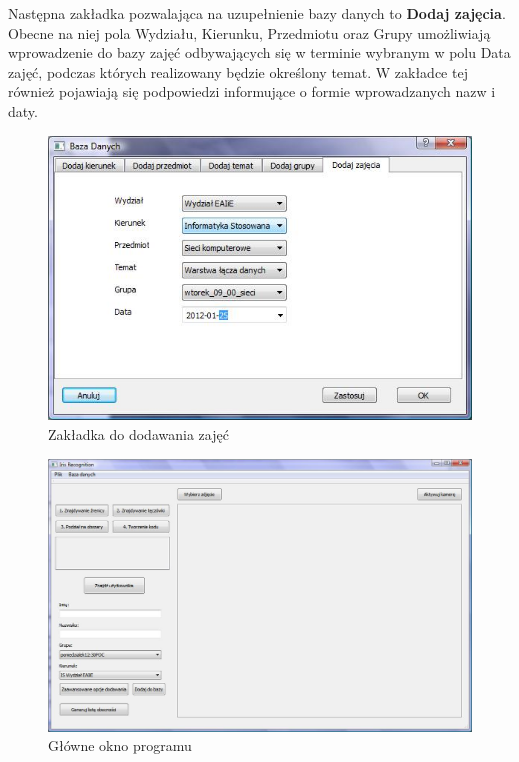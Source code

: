 Następna zakładka pozwalająca na uzupełnienie bazy danych to \textbf{Dodaj zajęcia}. Obecne na niej pola Wydziału, Kierunku, Przedmiotu oraz Grupy umożliwiają wprowadzenie do bazy zajęć odbywających się w terminie wybranym w polu Data zajęć, podczas których realizowany będzie określony temat. W zakładce tej również pojawiają się podpowiedzi informujące o formie wprowadzanych nazw i daty.

\begin{figure}
\begin{center}
\includegraphics[scale=0.7]{dodaj_zajecia.jpg}
\caption{Zakładka do dodawania zajęć}
\label{fig:dodajZajecia}
\end{center}
\end{figure}

\begin{figure}
\begin{center}
\includegraphics[scale=0.5]{okno_glowne.jpg}
\caption{Główne okno programu}
\label{fig:oknoGlowne}
\end{center}
\end{figure}

